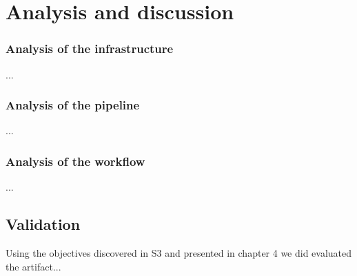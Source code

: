 \chapter{Analysis and discussion}

\subsection{Analysis of the infrastructure}

...

\subsection{Analysis of the pipeline}

...

\subsection{Analysis of the workflow}

...

\section{Validation}

Using the objectives discovered in S3 and presented in chapter 4 we did evaluated the artifact...